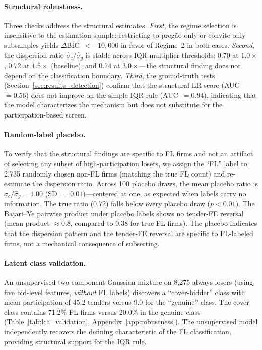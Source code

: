\paragraph{Structural robustness.}
Three checks address the structural estimates. \emph{First}, the
regime selection is insensitive to the estimation sample: restricting
to preg\~ao-only or convite-only subsamples yields
$\Delta$BIC~$< -10{,}000$ in favor of Regime~2 in both cases.
\emph{Second}, the dispersion ratio $\hat{\sigma}_c / \hat{\sigma}_g$
is stable across IQR multiplier thresholds: 0.70 at $1.0\times$,
0.72 at $1.5\times$ (baseline), and 0.74 at $3.0\times$---the
structural finding does not depend on the classification boundary.
\emph{Third}, the ground-truth tests
(Section~\ref{sec:results_detection}) confirm that the structural
LR score (AUC~$= 0.56$) does not improve on the simple IQR rule
(AUC~$= 0.94$), indicating that the model characterizes the
mechanism but does not substitute for the participation-based screen.

\paragraph{Random-label placebo.}
To verify that the structural findings are specific to FL firms and
not an artifact of selecting any subset of high-participation losers,
we assign the ``FL'' label to 2,735 randomly chosen non-FL firms
(matching the true FL count) and re-estimate the dispersion ratio.
Across 100 placebo draws, the mean placebo ratio is
$\hat{\sigma}_c / \hat{\sigma}_g = 1.00$ (SD~$= 0.01$)---centered
at one, as expected when labels carry no information. The true ratio
(0.72) falls below every placebo draw ($p < 0.01$). The Bajari--Ye
pairwise product under placebo labels shows no tender-FE reversal
(mean product $\approx 0.8$, compared to 0.38 for true FL firms).
The placebo indicates that the dispersion pattern and the tender-FE
reversal are specific to FL-labeled firms, not a mechanical
consequence of subsetting.

\paragraph{Latent class validation.}
An unsupervised two-component Gaussian mixture on 8,275 always-losers
(using five bid-level features, \emph{without} FL labels) discovers
a ``cover-bidder'' class with mean participation of 45.2 tenders
versus 9.0 for the ``genuine'' class. The cover class contains
71.2\% FL firms versus 20.0\% in the genuine class
(Table~\ref{tab:lca_validation}, Appendix~\ref{app:robustness}).
The unsupervised model independently recovers the defining
characteristic of the FL classification, providing structural support
for the IQR rule.

